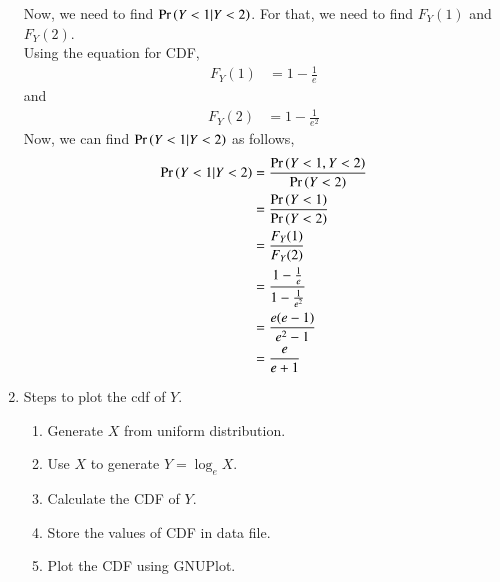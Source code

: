 \documentclass[journal,11pt]{IEEEtran}
\begin{document}
\begin{enumerate}
Now, we need to find $\Pr\left(Y<1 | Y<2 \right)$.
For that, we need to find $F_Y(1)$ and $F_Y(2)$.\\
Using the equation for CDF,
\begin{align}
    F_Y(1) & = 1 - \frac{1}{e}
\end{align}
and
\begin{align}
    F_Y(2) & = 1 - \frac{1}{e^2}
\end{align}
Now, we can find $\Pr\left(Y<1 | Y<2 \right)$ as follows,
\begin{align}
    \Pr\left(Y<1 | Y<2 \right) & = \frac{\Pr\left(Y<1 , Y<2\right)}{\Pr\left(Y<2\right)}           \\
                    & = \frac{\Pr\left(Y<1\right)}{\Pr\left(Y<2\right)}                 \\
                    & = \frac{F_Y(1)}{F_Y(2)}                     \\
                    & = \frac{1 - \frac{1}{e}}{1 - \frac{1}{e^2}} \\
                    & = \frac{e(e-1)}{e^2-1}                      \\
                    & = \frac{e}{e+1}
\end{align}

\item Steps to plot the cdf of $Y$.
\begin{enumerate}
    \item Generate $X$ from uniform distribution.
    \item Use $X$ to generate $Y = \log_e X$.
    \item Calculate the CDF of $Y$.
    \item Store the values of CDF in data file.
    \item Plot the CDF using GNUPlot.
\end{enumerate}
\end{enumerate}                                 
\end{document}
